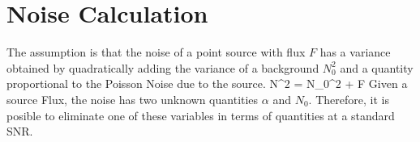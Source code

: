 \documentclass{article}
\begin{document}
\section{Noise Calculation}

The assumption is that the noise of a point source with flux $F$ has a variance 
 obtained by quadratically adding the variance of a background $N_0^2$ and a quantity proportional to the Poisson Noise due to the source.
\be
N^2 = N_0^2 + \alpha F 
\ee
Given a source Flux, the noise has two unknown quantities $\alpha$ and $N_0$.
Therefore, it is posible to eliminate one of these variables in terms of 
quantities at a standard SNR.
\end{document}
